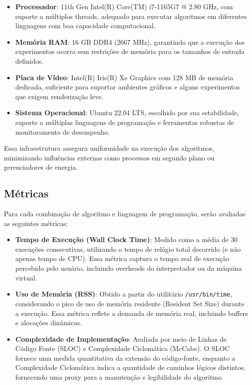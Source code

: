 \documentclass[12pt, a4paper]{article}
\begin{document}
\begin{itemize}
    \item \textbf{Processador}: 11th Gen Intel(R) Core(TM) i7-1165G7 @ 2.80 GHz, com suporte a múltiplos threads, adequado para executar algoritmos em diferentes linguagens com boa capacidade computacional.
    \item \textbf{Memória RAM}: 16 GB DDR4 (2667 MHz), garantindo que a execução dos experimentos ocorra sem restrições de memória para os tamanhos de entrada definidos.
    \item \textbf{Placa de Vídeo}: Intel(R) Iris(R) Xe Graphics com 128 MB de memória dedicada, suficiente para suportar ambientes gráficos e alguns experimentos que exigem renderização leve.
    \item \textbf{Sistema Operacional}: Ubuntu 22.04 LTS, escolhido por sua estabilidade, suporte a múltiplas linguagens de programação e ferramentas robustas de monitoramento de desempenho.
\end{itemize}

Essa infraestrutura assegura uniformidade na execução dos algoritmos, minimizando influências externas como processos em segundo plano ou gerenciadores de energia.

\subsection{Métricas}

Para cada combinação de algoritmo e linguagem de programação, serão avaliadas as seguintes métricas:

\begin{itemize}
    \item \textbf{Tempo de Execução (Wall Clock Time)}: Medido como a média de 30 execuções consecutivas, utilizando o tempo de relógio total decorrido (e não apenas tempo de CPU). Essa métrica captura o tempo real de execução percebido pelo usuário, incluindo overheads do interpretador ou da máquina virtual.
    \item \textbf{Uso de Memória (RSS)}: Obtido a partir do utilitário \texttt{/usr/bin/time}, considerando o pico de uso de memória residente (Resident Set Size) durante a execução. Essa métrica reflete a demanda de memória real, incluindo buffers e alocações dinâmicas.
    \item \textbf{Complexidade de Implementação}: Avaliada por meio de Linhas de Código Fonte (SLOC) e Complexidade Ciclomática (McCabe). O SLOC fornece uma medida quantitativa da extensão do código-fonte, enquanto a Complexidade Ciclomática indica a quantidade de caminhos lógicos distintos, fornecendo uma proxy para a manutenção e legibilidade do algoritmo.
\end{itemize}
\end{document}

